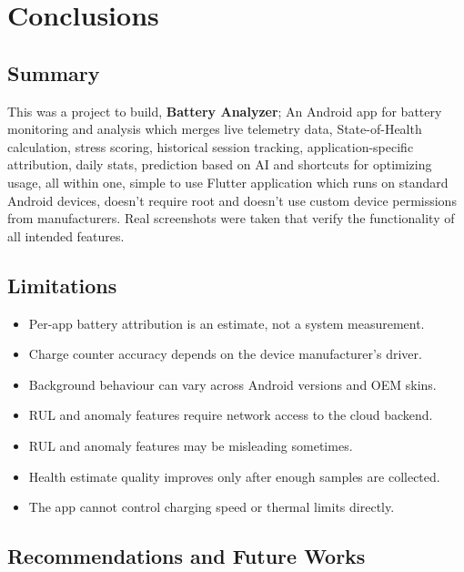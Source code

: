 \documentclass[12pt,a4paper]{report}
\begin{document}
\chapter{Conclusions}

\section{Summary}

This was a project to build, \textbf{Battery Analyzer}; An Android app for battery monitoring and analysis which merges live telemetry data, State-of-Health calculation, stress scoring, historical session tracking, application-specific attribution, daily stats, prediction based on AI and shortcuts for optimizing usage, all within one, simple to use Flutter application which runs on standard Android devices, doesn't require root and doesn't use custom device permissions from manufacturers. Real screenshots were taken that verify the functionality of all intended features.

\section{Limitations}

\begin{itemize}[leftmargin=1.5em]
  \item Per-app battery attribution is an estimate, not a system measurement.
  \item Charge counter accuracy depends on the device manufacturer's driver.
  \item Background behaviour can vary across Android versions and OEM skins.
  \item RUL and anomaly features require network access to the cloud backend.
  \item RUL and anomaly features may be misleading sometimes.
  \item Health estimate quality improves only after enough samples are collected.
  \item The app cannot control charging speed or thermal limits directly.
\end{itemize}

\section{Recommendations and Future Works}
\end{document}

